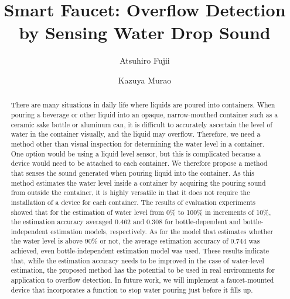 \documentclass[sigconf]{acmart}
\begin{document}
\title{Smart Faucet: Overflow Detection by Sensing Water Drop Sound}

\author{Atsuhiro Fujii}

\author{Kazuya Murao}

\renewcommand{\shortauthors}{Fujii and Murao}

\begin{abstract}
  There are many situations in daily life where liquids are poured into containers. When pouring a beverage or other liquid into an opaque, narrow-mouthed container such as a ceramic sake bottle or aluminum can, it is difficult to accurately ascertain the level of water in the container visually, and the liquid may overflow. Therefore, we need a method other than visual inspection for determining the water level in a container. One option would be using a liquid level sensor, but this is complicated because a device would need to be attached to each container. We therefore propose a method that senses the sound generated when pouring liquid into the container. As this method estimates the water level inside a container by acquiring the pouring sound from outside the container, it is highly versatile in that it does not require the installation of a device for each container. The results of evaluation experiments showed that for the estimation of water level from 0\% to 100\% in increments of 10\%, the estimation accuracy averaged 0.462 and 0.308 for bottle-dependent and bottle-independent estimation models, respectively. As for the model that estimates whether the water level is above 90\% or not, the average estimation accuracy of 0.744 was achieved, even bottle-independent estimation model was used. These results indicate that, while the estimation accuracy needs to be improved in the case of water-level estimation, the proposed method has the potential to be used in real environments for application to overflow detection. In future work, we will implement a faucet-mounted device that incorporates a function to stop water pouring just before it fills up.
\end{abstract}
\end{document}
